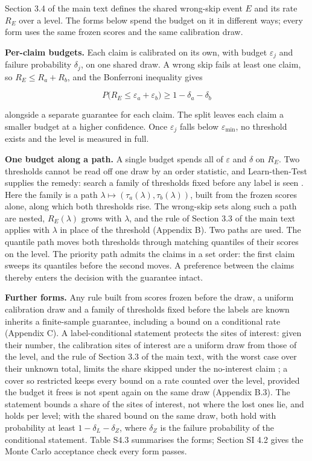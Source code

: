 \documentclass{iopjournal}
\begin{document}
Section 3.4 of the main text defines the shared wrong-skip event \(E\) and its rate \(R_E\) over a level. The forms below spend the budget on it in different ways; every form uses the same frozen scores and the same calibration draw.

\textbf{Per-claim budgets.} Each claim is calibrated on its own, with budget \(\varepsilon_j\) and failure probability \(\delta_j\), on one shared draw. A wrong skip fails at least one claim, so \(R_E \le R_a + R_b\), and the Bonferroni inequality gives

\[
P\big(R_E \le \varepsilon_a + \varepsilon_b\big) \ge 1 - \delta_a - \delta_b
\]

alongside a separate guarantee for each claim. The split leaves each claim a smaller budget at a higher confidence. Once \(\varepsilon_j\) falls below \(\varepsilon_{\min}\), no threshold exists and the level is measured in full.

\textbf{One budget along a path.} A single budget spends all of \(\varepsilon\) and \(\delta\) on \(R_E\). Two thresholds cannot be read off one draw by an order statistic, and Learn-then-Test supplies the remedy: search a family of thresholds fixed before any label is seen \cite{Angelopoulos2025}. Here the family is a path \(\lambda \mapsto (\tau_a(\lambda), \tau_b(\lambda))\), built from the frozen scores alone, along which both thresholds rise. The wrong-skip sets along such a path are nested, \(R_E(\lambda)\) grows with \(\lambda\), and the rule of Section 3.3 of the main text applies with \(\lambda\) in place of the threshold (Appendix B). Two paths are used. The quantile path moves both thresholds through matching quantiles of their scores on the level. The priority path admits the claims in a set order: the first claim sweeps its quantiles before the second moves. A preference between the claims thereby enters the decision with the guarantee intact.

\textbf{Further forms.} Any rule built from scores frozen before the draw, a uniform calibration draw and a family of thresholds fixed before the labels are known inherits a finite-sample guarantee, including a bound on a conditional rate (Appendix C). A label-conditional statement protects the sites of interest: given their number, the calibration sites of interest are a uniform draw from those of the level, and the rule of Section 3.3 of the main text, with the worst case over their unknown total, limits the share skipped under the no-interest claim \cite{Vovk2005,Sadinle2019,Tong2018}; a cover so restricted keeps every bound on a rate counted over the level, provided the budget it frees is not spent again on the same draw (Appendix B.3). The statement bounds a share of the sites of interest, not where the lost ones lie, and holds per level; with the shared bound on the same draw, both hold with probability at least \(1 - \delta_L - \delta_Z\), where \(\delta_Z\) is the failure probability of the conditional statement. Table S4.3 summarises the forms; Section SI 4.2 gives the Monte Carlo acceptance check every form passes.
\end{document}
